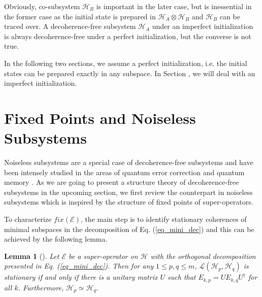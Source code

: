 \documentclass[journal]{IEEEtran}
\def\h{\ensuremath{\mathcal{H}}}
\def\l{\ensuremath{\mathcal{L}}}
\def\e{\ensuremath{\mathcal{E}}}
\def\l{\ensuremath{\mathcal{L}}}
\def\l{\mathcal{L}}
\newtheorem{lemma}{Lemma}
\begin{document}
Obviously, co-subsystem $\h_B$ is important in the later case, but is inessential in the former case as the initial state is prepared in $\h_A\otimes \h_B$ and $\h_B$ can be traced over. A decoherence-free subsystem $\h_A$ under an imperfect initialization is always decoherence-free under a perfect initialization, but the converse is not true. 

In the following two sections, we assume a perfect initialization, i.e. the initial states can be prepared exactly in any subspace. In Section \uppercase\expandafter{},  we will deal with an imperfect initialization.  

\section{Fixed Points and Noiseless Subsystems}
Noiseless subsystems are a special case of decoherence-free subsystems and have been intensely studied in the areas of quantum error correction \cite{kribs2005operator,beny2007generalization} and quantum memory \cite{kuperberg2003capacity}. As we are going to present a structure theory of decoherence-free subsystems in the upcoming section, we first review the counterpart in noiseless subsystems which is inspired by the structure of fixed points of super-operators.  

To characterize  $fix(\e)$, the main step is to identify stationary coherences of minimal subspaces in  the decomposition of Eq. (\ref{eq_mini_dec}) and this can be achieved  by the following lemma.

\begin{lemma}[\cite{baumgartner2012structure}]\label{Lem_SC}
  Let $\e$ be a super-operator on $\h$ with the orthogonal decomposition presented in Eq. (\ref{eq_mini_dec}). Then for any $1\leq p, q\leq m$, $\l(\h_p,\h_q)$ is stationary if and only if there is a unitary matrix $U$ such that 
  $E_{k,p}=UE_{k,q}U^\dagger$ for all $k$.
  Furthermore, $\h_p\simeq\h_q.$
\end{lemma}
\end{document}
